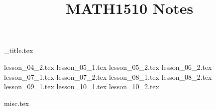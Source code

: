 \documentclass{article}
\title{MATH1510 Notes}
\author{}
\date{}
\begin{document}
{_title.tex}

\renewcommand{\baselinestretch}{0}\normalsize
\tableofcontents
\renewcommand{\baselinestretch}{1.0}\normalsize

{lesson_04_2.tex}
{lesson_05_1.tex}
{lesson_05_2.tex}
{lesson_06_2.tex}
{lesson_07_1.tex}
{lesson_07_2.tex}
{lesson_08_1.tex}
{lesson_08_2.tex}
{lesson_09_1.tex}
{lesson_10_1.tex}
{lesson_10_2.tex}

{misc.tex}
\end{document}
